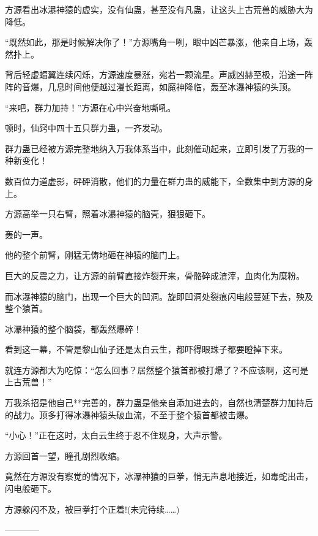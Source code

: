 \begin{this_body}
方源看出冰瀑神猿的虚实，没有仙蛊，甚至没有凡蛊，让这头上古荒兽的威胁大为降低。

“既然如此，那是时候解决你了！”方源嘴角一咧，眼中凶芒暴涨，他亲自上场，轰然扑上。

背后轻虚蝠翼连续闪烁，方源速度暴涨，宛若一颗流星。声威凶赫至极，沿途一阵阵的音爆，几息时间他便越过漫长距离，如魔神降临，轰至冰瀑神猿的头顶。

“来吧，群力加持！”方源在心中兴奋地嘶吼。

顿时，仙窍中四十五只群力蛊，一齐发动。

群力蛊已经被方源完整地纳入万我体系当中，此刻催动起来，立即引发了万我的一种新变化！

数百位力道虚影，砰砰消散，他们的力量在群力蛊的威能下，全数集中到方源的身上。

方源高举一只右臂，照着冰瀑神猿的脑壳，狠狠砸下。

轰的一声。

他的整个前臂，刚猛无俦地砸在神猿的脑门上。

巨大的反震之力，让方源的前臂直接炸裂开来，骨骼碎成渣滓，血肉化为糜粉。

而冰瀑神猿的脑门，出现一个巨大的凹洞。旋即凹洞处裂痕闪电般蔓延下去，殃及整个猿首。

冰瀑神猿的整个脑袋，都轰然爆碎！

看到这一幕，不管是黎山仙子还是太白云生，都吓得眼珠子都要瞪掉下来。

就连方源都大为吃惊：“怎么回事？居然整个猿首都被打爆了？不应该啊，这可是上古荒兽！”

万我杀招是他自己**完善的，群力蛊是他亲自添加进去的，自然也清楚群力加持后的战力。顶多打得冰瀑神猿头破血流，不至于整个猿首都被击爆。

“小心！”正在这时，太白云生终于忍不住现身，大声示警。

方源回首一望，瞳孔剧烈收缩。

竟然在方源没有察觉的情况下，冰瀑神猿的巨拳，悄无声息地接近，如毒蛇出击，闪电般砸下。

方源躲闪不及，被巨拳打个正着!(未完待续……)

------------

\end{this_body}

